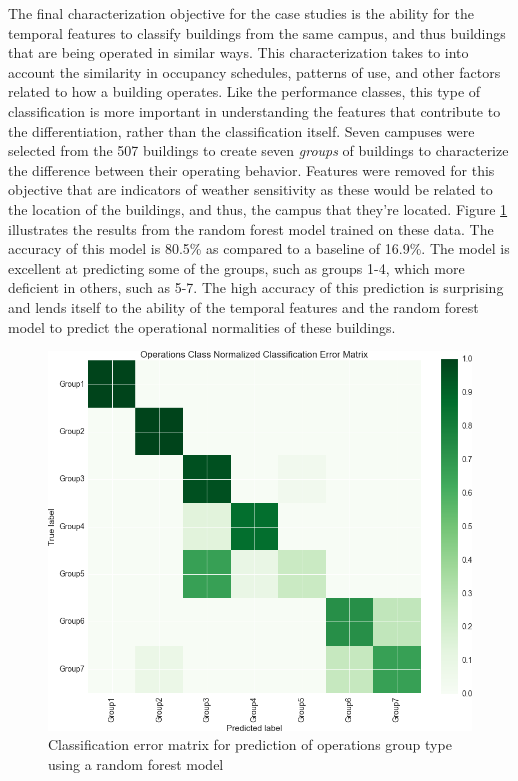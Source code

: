 The final characterization objective for the case studies is the ability for the temporal features to classify buildings from the same campus, and thus buildings that are being operated in similar ways. This characterization takes to into account the similarity in occupancy schedules, patterns of use, and other factors related to how a building operates. Like the performance classes, this type of classification is more important in understanding the features that contribute to the differentiation, rather than the classification itself. Seven campuses were selected from the 507 buildings to create seven \emph{groups} of buildings to characterize the difference between their operating behavior. Features were removed for this objective that are indicators of weather sensitivity as these would be related to the location of the buildings, and thus, the campus that they're located. Figure \ref{fig:operations_classification} illustrates the results from the random forest model trained on these data. The accuracy of this model is 80.5\% as compared to a baseline of 16.9\%. The model is excellent at predicting some of the groups, such as groups 1-4, which more deficient in others, such as 5-7. The high accuracy of this prediction is surprising and lends itself to the ability of the temporal features and the random forest model to predict the operational normalities of these buildings.

\begin{figure}[ht!]
\begin{center}
\includegraphics[width=1\columnwidth]{figures/ConfusionMatrixOperationsClass/ConfusionMatrixOperationsClass}
\caption{{Classification error matrix for prediction of operations group type using a random forest model
\label{fig:operations_classification}%
}}
\end{center}
\end{figure}

